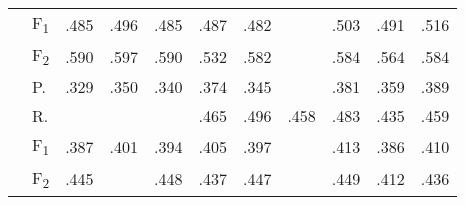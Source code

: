 \begin{tabularx}{\textwidth}{p{1.3em}lZZZZZZZZZ}
                                                            & F\textsubscript{1}                              & .485          & .496                     & .485                    & .487          & .482          &  & .503          & .491        & .516          \\
                                                            & F\textsubscript{2}                              & .590          & .597                     & .590                    & .532          & .582          &  & .584          & .564        & .584          \\	\midrule
                       & P.                                              & .329          & .350                     & .340                    & .374          & .345          &  & .381          & .359        & .389          \\
                                                            & R.                                              &  &             &            & .465          & .496          & .458          & .483          & .435        & .459          \\
                                                            & F\textsubscript{1}                              & .387          & .401                     & .394                    & .405          & .397          &  & .413          & .386        & .410          \\
                                                            & F\textsubscript{2}                              & .445          &             & .448                    & .437          & .447          &  & .449          & .412        & .436          \\    %
        \bottomrule
    \end{tabularx}
